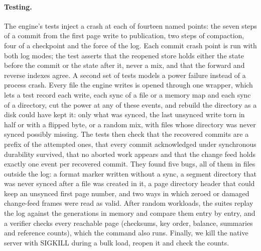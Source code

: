 \paragraph{Testing.} The engine's tests inject a crash at each of fourteen named points: the seven steps of a commit from the first page write to publication, two steps of compaction, four of a checkpoint and the force of the log. Each commit crash point is run with both log modes; the test asserts that the reopened store holds either the state before the commit or the state after it, never a mix, and that the forward and reverse indexes agree. A second set of tests models a power failure instead of a process crash. Every file the engine writes is opened through one wrapper, which lets a test record each write, each sync of a file or a memory map and each sync of a directory, cut the power at any of these events, and rebuild the directory as a disk could have kept it: only what was synced, the last unsynced write torn in half or with a flipped byte, or a random mix, with files whose directory was never synced possibly missing. The tests then check that the recovered commits are a prefix of the attempted ones, that every commit acknowledged under synchronous durability survived, that no aborted work appears and that the change feed holds exactly one event per recovered commit. They found five bugs, all of them in files outside the log: a format marker written without a sync, a segment directory that was never synced after a file was created in it, a page directory header that could keep an unsynced first page number, and two ways in which zeroed or damaged change-feed frames were read as valid. After random workloads, the suites replay the log against the generations in memory and compare them entry by entry, and a verifier checks every reachable page (checksums, key order, balance, summaries and reference counts), which the  command also runs. Finally, we kill the native server with SIGKILL during a bulk load, reopen it and check the counts.
